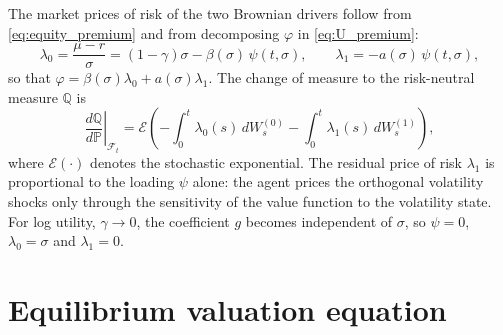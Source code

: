 \documentclass[11pt]{article}
\theoremstyle{remark}
\newcommand{\PP}{\mathbb{P}}
\newcommand{\QQ}{\mathbb{Q}}
\begin{document}
The market prices of risk of the two Brownian drivers follow from \eqref{eq:equity_premium} and from decomposing $\varphi$ in \eqref{eq:U_premium}:
\begin{equation}\label{eq:mprs}
\lambda_{0} = \frac{\mu-r}{\sigma} = (1 - \gamma)\sigma  - \beta(\sigma)\, \psi (t, \sigma),
\qquad
\lambda_{1} = -a(\sigma)\, \psi (t, \sigma),
\end{equation}
so that $\varphi = \beta(\sigma)\lambda_{0} + a(\sigma)\lambda_{1}$. The change of measure to the risk-neutral measure $\QQ$ is
\begin{equation}\label{eq:girsanov}
\left.\frac{d\QQ}{d\PP}\right|_{\mathcal{F}_t}=\mathcal{E}\left(-\int_0^t \lambda_0(s)\,dW^{(0)}_s-\int_0^t\lambda_1(s)\,dW^{(1)}_s\right),
\end{equation}
where $\mathcal{E}(\cdot)$ denotes the stochastic exponential. The residual price of risk $\lambda_{1}$ is proportional to the loading $\psi$ alone: the agent prices the orthogonal volatility shocks only through the sensitivity of the value function to the volatility state. For log utility, $\gamma \to 0$, the coefficient $g$ becomes independent of $\sigma$, so $\psi=0$, $\lambda_{0} = \sigma$ and $\lambda_{1} = 0$.

\section{Equilibrium valuation equation}\label{sec:pricing}
\end{document}
